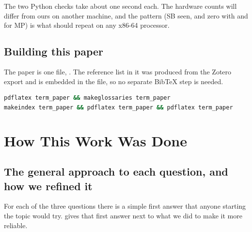 The two Python checks take about one second each. The hardware counts will differ from ours on another machine, and the pattern (SB  seen, and zero with  and for MP) is what should repeat on any x86-64 processor.

\section*{Building this paper}

The paper is one file, . The reference list in it was produced from the Zotero export  and is embedded in the file, so no separate BibTeX step is needed.

\begin{lstlisting}[language=bash]
pdflatex term_paper && makeglossaries term_paper
makeindex term_paper && pdflatex term_paper && pdflatex term_paper
\end{lstlisting}

\chapter{How This Work Was Done}
\label{app:how}

\section{The general approach to each question, and how we refined it}
\label{sec:generalapproach}

For each of the three questions there is a simple first answer that anyone starting the topic would try.  gives that first answer next to what we did to make it more reliable.

